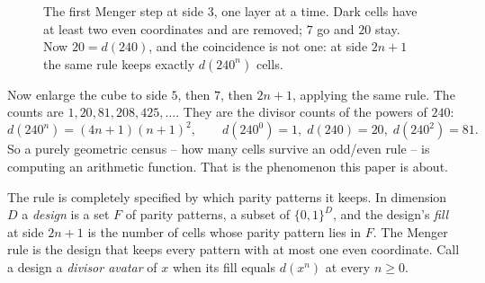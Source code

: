 \documentclass[11pt]{amsart}
\theoremstyle{definition}
\theoremstyle{remark}
\begin{document}
\begin{figure}[ht]
\centering
{}
\caption{The first Menger step at side $3$, one layer at a time. Dark cells have at least two even coordinates and are removed; $7$ go and $20$ stay. Now $20 = d(240)$, and the coincidence is not one: at side $2n+1$ the same rule keeps exactly $d(240^{n})$ cells.}
\label{fig:sponge}
\end{figure}

Now enlarge the cube to side $5$, then $7$, then $2n+1$, applying the same rule. The counts are $1, 20, 81, 208, 425, \dots$. They are the divisor counts of the powers of $240$:
\[
  d(240^{n}) = (4n+1)(n+1)^{2}, \qquad d(240^{0})=1,\; d(240)=20,\; d(240^{2})=81 .
\]
So a purely geometric census -- how many cells survive an odd/even rule -- is computing an arithmetic function. That is the phenomenon this paper is about.

The rule is completely specified by which parity patterns it keeps. In dimension $D$ a \emph{design} is a set $F$ of parity patterns, a subset of $\{0,1\}^{D}$, and the design's \emph{fill} at side $2n+1$ is the number of cells whose parity pattern lies in $F$. The Menger rule is the design that keeps every pattern with at most one even coordinate. Call a design a \emph{divisor avatar} of $x$ when its fill equals $d(x^{n})$ at every $n \ge 0$.
\end{document}
